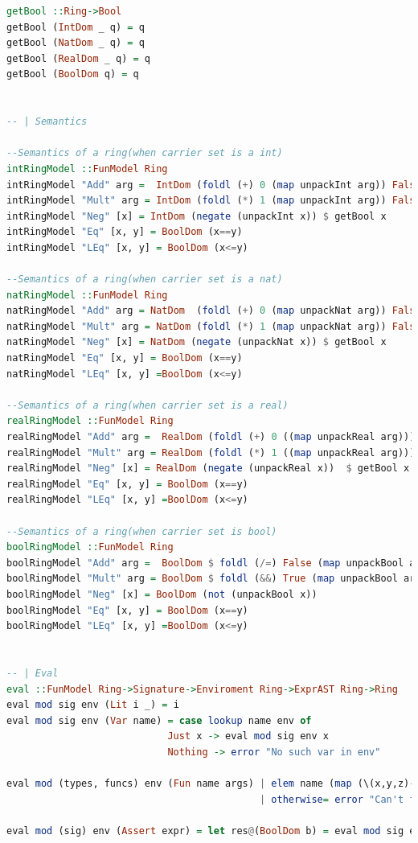 \documentclass[tikz, border=5mm]{article}
\begin{document}
\begin{lstlisting}[language=Haskell]
getBool ::Ring->Bool
getBool (IntDom _ q) = q
getBool (NatDom _ q) = q
getBool (RealDom _ q) = q
getBool (BoolDom q) = q


-- | Semantics 

--Semantics of a ring(when carrier set is a int)
intRingModel ::FunModel Ring
intRingModel "Add" arg =  IntDom (foldl (+) 0 (map unpackInt arg)) False
intRingModel "Mult" arg = IntDom (foldl (*) 1 (map unpackInt arg)) False
intRingModel "Neg" [x] = IntDom (negate (unpackInt x)) $ getBool x
intRingModel "Eq" [x, y] = BoolDom (x==y)
intRingModel "LEq" [x, y] = BoolDom (x<=y)

--Semantics of a ring(when carrier set is a nat)
natRingModel ::FunModel Ring
natRingModel "Add" arg = NatDom  (foldl (+) 0 (map unpackNat arg)) False
natRingModel "Mult" arg = NatDom (foldl (*) 1 (map unpackNat arg)) False
natRingModel "Neg" [x] = NatDom (negate (unpackNat x)) $ getBool x
natRingModel "Eq" [x, y] = BoolDom (x==y)
natRingModel "LEq" [x, y] =BoolDom (x<=y)

--Semantics of a ring(when carrier set is a real)
realRingModel ::FunModel Ring
realRingModel "Add" arg =  RealDom (foldl (+) 0 ((map unpackReal arg))) False
realRingModel "Mult" arg = RealDom (foldl (*) 1 ((map unpackReal arg))) False
realRingModel "Neg" [x] = RealDom (negate (unpackReal x))  $ getBool x
realRingModel "Eq" [x, y] = BoolDom (x==y)
realRingModel "LEq" [x, y] =BoolDom (x<=y)

--Semantics of a ring(when carrier set is bool)
boolRingModel ::FunModel Ring
boolRingModel "Add" arg =  BoolDom $ foldl (/=) False (map unpackBool arg)
boolRingModel "Mult" arg = BoolDom $ foldl (&&) True (map unpackBool arg)
boolRingModel "Neg" [x] = BoolDom (not (unpackBool x))
boolRingModel "Eq" [x, y] = BoolDom (x==y)
boolRingModel "LEq" [x, y] =BoolDom (x<=y)


-- | Eval
eval ::FunModel Ring->Signature->Enviroment Ring->ExprAST Ring->Ring
eval mod sig env (Lit i _) = i
eval mod sig env (Var name) = case lookup name env of
                            Just x -> eval mod sig env x
                            Nothing -> error "No such var in env"

eval mod (types, funcs) env (Fun name args) | elem name (map (\(x,y,z)->x) funcs) =mod name (map (eval mod (types, funcs) env) args)
                                            | otherwise= error "Can't find function in signature"

eval mod (sig) env (Assert expr) = let res@(BoolDom b) = eval mod sig env expr in if b then res else error $"Assert did not hold"++ (show expr)



\end{lstlisting}
\end{document}
